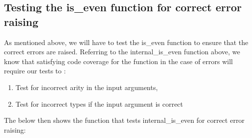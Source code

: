 \subsection{Testing the is\_even function for correct error raising}
As mentioned above, we will have to test the is\_even function to ensure that the correct errors are raised. Referring to the internal\_is\_even function above, we know that satisfying code coverage for the function in the case of 
errors will require our tests to : 
\begin{enumerate}
   \item Test for incorrect arity in the input arguments,
   \item Test for incorrect types if the input argument is correct
\end{enumerate}
The below then shows the function that tests internal\_is\_even for correct error raising:
